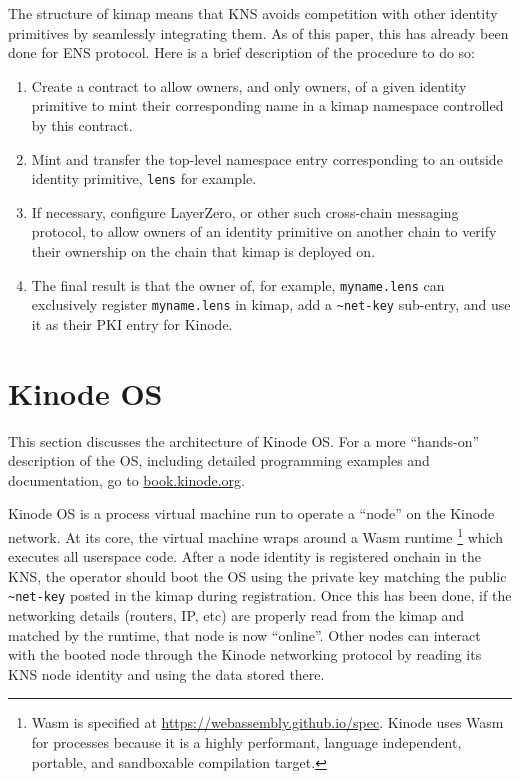\documentclass[runningheads]{llncs}
\begin{document}
The structure of kimap means that KNS avoids competition with other identity primitives by seamlessly integrating them.
As of this paper, this has already been done for ENS protocol.
Here is a brief description of the procedure to do so:
\begin{enumerate}
    \item Create a contract to allow owners, and only owners, of a given identity primitive to mint their corresponding name in a kimap namespace controlled by this contract.
    \item Mint and transfer the top-level namespace entry corresponding to an outside identity primitive, \verb|lens| for example.
    \item If necessary, configure LayerZero, or other such cross-chain messaging protocol, to allow owners of an identity primitive on another chain to verify their ownership on the chain that kimap is deployed on.
    \item The final result is that the owner of, for example, \verb|myname.lens| can exclusively register \verb|myname.lens| in kimap, add a \verb|~net-key| sub-entry, and use it as their PKI entry for Kinode.
\end{enumerate}

\section{Kinode OS}
\label{sec:os}

This section discusses the architecture of Kinode OS.
For a more ``hands-on'' description of the OS, including detailed programming examples and documentation, go to \href{https://book.kinode.org/}{book.kinode.org}.

Kinode OS is a process virtual machine run to operate a ``node'' on the Kinode network.
At its core, the virtual machine wraps around a Wasm runtime
\footnote{Wasm is specified at \url{https://webassembly.github.io/spec}. Kinode uses Wasm for processes because it is a highly performant, language independent, portable, and sandboxable compilation target.}
which executes all userspace code.
After a node identity is registered onchain in the KNS, the operator should boot the OS using the private key matching the public \verb|~net-key| posted in the kimap during registration.
Once this has been done, if the networking details (routers, IP, etc) are properly read from the kimap and matched by the runtime, that node is now ``online''.
Other nodes can interact with the booted node through the Kinode networking protocol by reading its KNS node identity and using the data stored there.
\end{document}
